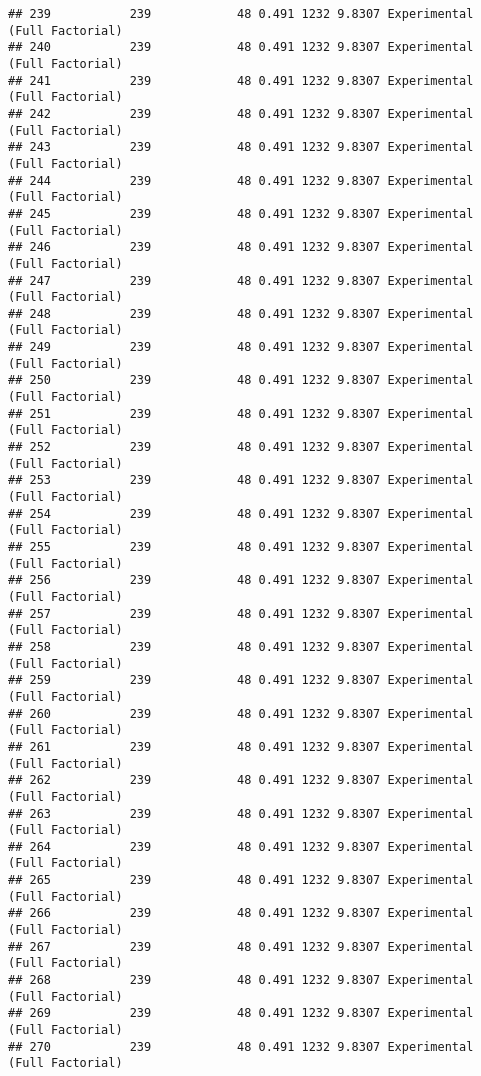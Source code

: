\documentclass[]{article}
\begin{document}
\begin{verbatim}
## 239           239            48 0.491 1232 9.8307 Experimental (Full Factorial)
## 240           239            48 0.491 1232 9.8307 Experimental (Full Factorial)
## 241           239            48 0.491 1232 9.8307 Experimental (Full Factorial)
## 242           239            48 0.491 1232 9.8307 Experimental (Full Factorial)
## 243           239            48 0.491 1232 9.8307 Experimental (Full Factorial)
## 244           239            48 0.491 1232 9.8307 Experimental (Full Factorial)
## 245           239            48 0.491 1232 9.8307 Experimental (Full Factorial)
## 246           239            48 0.491 1232 9.8307 Experimental (Full Factorial)
## 247           239            48 0.491 1232 9.8307 Experimental (Full Factorial)
## 248           239            48 0.491 1232 9.8307 Experimental (Full Factorial)
## 249           239            48 0.491 1232 9.8307 Experimental (Full Factorial)
## 250           239            48 0.491 1232 9.8307 Experimental (Full Factorial)
## 251           239            48 0.491 1232 9.8307 Experimental (Full Factorial)
## 252           239            48 0.491 1232 9.8307 Experimental (Full Factorial)
## 253           239            48 0.491 1232 9.8307 Experimental (Full Factorial)
## 254           239            48 0.491 1232 9.8307 Experimental (Full Factorial)
## 255           239            48 0.491 1232 9.8307 Experimental (Full Factorial)
## 256           239            48 0.491 1232 9.8307 Experimental (Full Factorial)
## 257           239            48 0.491 1232 9.8307 Experimental (Full Factorial)
## 258           239            48 0.491 1232 9.8307 Experimental (Full Factorial)
## 259           239            48 0.491 1232 9.8307 Experimental (Full Factorial)
## 260           239            48 0.491 1232 9.8307 Experimental (Full Factorial)
## 261           239            48 0.491 1232 9.8307 Experimental (Full Factorial)
## 262           239            48 0.491 1232 9.8307 Experimental (Full Factorial)
## 263           239            48 0.491 1232 9.8307 Experimental (Full Factorial)
## 264           239            48 0.491 1232 9.8307 Experimental (Full Factorial)
## 265           239            48 0.491 1232 9.8307 Experimental (Full Factorial)
## 266           239            48 0.491 1232 9.8307 Experimental (Full Factorial)
## 267           239            48 0.491 1232 9.8307 Experimental (Full Factorial)
## 268           239            48 0.491 1232 9.8307 Experimental (Full Factorial)
## 269           239            48 0.491 1232 9.8307 Experimental (Full Factorial)
## 270           239            48 0.491 1232 9.8307 Experimental (Full Factorial)

\end{verbatim}
\end{document}

